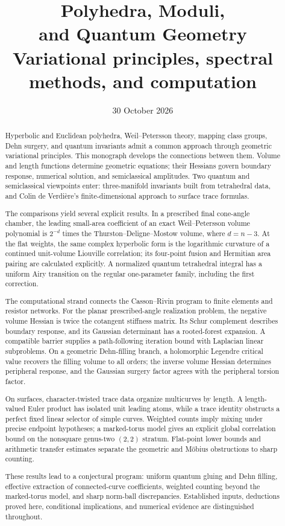 \documentclass[11pt,a4paper]{article}
\title{\textbf{Polyhedra, Moduli,\\and Quantum Geometry}\\[8pt]
\large Variational principles, spectral methods, and computation}
\author{}
\date{30 October 2026}
\numberwithin{equation}{section}
\theoremstyle{definition}
\theoremstyle{remark}
\begin{document}
\maketitle
\thispagestyle{plain}

\begin{abstract}
Hyperbolic and Euclidean polyhedra, Weil--Petersson theory, mapping class
groups, Dehn surgery, and quantum invariants admit a common approach
through geometric variational principles. This monograph develops the
connections between them. Volume and length functions determine geometric
equations; their Hessians govern boundary response, numerical solution,
and semiclassical amplitudes. Two quantum and semiclassical viewpoints
enter: three-manifold invariants built from tetrahedral data, and Colin
de Verdi\`ere's finite-dimensional approach to surface trace formulas.

The comparisons yield several explicit results. In a prescribed final
cone-angle chamber, the leading small-area coefficient of an exact
Weil--Petersson volume polynomial is $2^{-d}$ times the
Thurston--Deligne--Mostow volume, where $d=n-3$. At the flat
weights, the same complex hyperbolic form is the logarithmic curvature
of a continued unit-volume Liouville correlation; its four-point fusion
and Hermitian area pairing are calculated explicitly. A normalized
quantum tetrahedral integral has a uniform Airy transition on the regular
one-parameter family, including the first correction.

The computational strand connects the Casson--Rivin program to finite
elements and resistor networks. For the planar prescribed-angle
realization problem, the negative volume Hessian is twice the cotangent
stiffness matrix. Its Schur complement describes boundary response, and
its Gaussian determinant has a rooted-forest expansion. A compatible
barrier supplies a path-following iteration bound with Laplacian linear
subproblems. On a geometric Dehn-filling branch, a holomorphic Legendre
critical value recovers the filling volume to all orders; the inverse
volume Hessian determines peripheral response, and the Gaussian surgery
factor agrees with the peripheral torsion factor.

On surfaces, character-twisted trace data organize multicurves by length.
A length-valued Euler product has isolated unit leading atoms, while a
trace identity obstructs a perfect fixed linear selector of simple curves.
Weighted counts imply mixing under precise endpoint hypotheses; a
marked-torus model gives an explicit global correlation bound on the
nonsquare genus-two $(2,2)$ stratum. Flat-point lower bounds and arithmetic
transfer estimates separate the geometric and M\"obius obstructions to
sharp counting.

These results lead to a conjectural program: uniform quantum gluing and
Dehn filling, effective extraction of connected-curve coefficients,
weighted counting beyond the marked-torus model, and sharp norm-ball
discrepancies. Established inputs, deductions proved here, conditional
implications, and numerical evidence are distinguished throughout.
\end{abstract}
\end{document}

